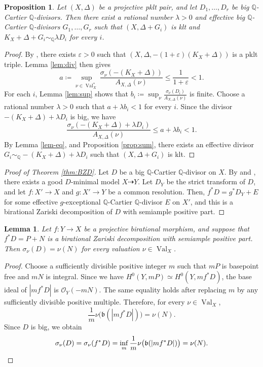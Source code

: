 \documentclass[a4paper,12pt]{amsart}
\newtheorem{lemma}[theorem]{Lemma}
\newtheorem{proposition}[theorem]{Proposition}
\theoremstyle{plain}
\theoremstyle{definition}
\numberwithin{equation}{section}
\newcommand{\Q}{\mathbb{Q}}
\newcommand{\OO}{\mathcal{O}}
\DeclareMathOperator{\Val}{Val}
\begin{document}
\begin{proposition}\label{prop:uniform-adjointization}
Let $(X,\Delta)$ be a projective pklt pair, and let $D_1,\dots,D_r$ be big $\Q$-Cartier $\Q$-divisors. Then there exist a rational number $\lambda>0$ and effective big $\Q$-Cartier $\Q$-divisors $G_1,\dots,G_r$ such that $(X,\Delta+G_i)$ is klt and $K_X+\Delta+G_i\sim_{\Q}\lambda D_i$ for every $i$.
\end{proposition}
\begin{proof}
By \cite[Proposition 4.1]{CJKL}, there exists $\varepsilon>0$ such that $(X,\Delta,-(1+\varepsilon)(K_X+\Delta))$ is a pklt triple. Lemma \ref{lem:div} then gives 
\[
a\coloneqq \sup_{\nu\in \Val_X^{\ast}} \frac{\sigma_{\nu}(-(K_X+\Delta))}{A_{X,\Delta}(\nu)}\leq \frac{1}{1+\varepsilon}<1.
\]
For each $i$, Lemma \ref{lem:sup} shows that $b_i\coloneqq \sup_{\nu} \frac{\sigma_{\nu}(D_i)}{A_{X,\Delta}(\nu)}$ is finite. Choose a rational number $\lambda>0$ such that $a+\lambda b_i<1$ for every $i$. Since the divisor $-(K_X+\Delta)+\lambda D_i$ is big, we have
\[
\frac{\sigma_{\nu}(-(K_X+\Delta)+\lambda D_i)}{A_{X,\Delta}(\nu)}\leq a+\lambda b_i<1.
\]
By Lemma \ref{lem-eq}, \cite[Theorem 3.7]{CJKL} and Proposition \ref{prop:sum}, there exists an effective divisor $G_i\sim_{\Q} -(K_X+\Delta)+\lambda D_i$ such that $(X,\Delta+G_i)$ is klt. 
\end{proof}

\begin{proof}[Proof of Theorem \ref{thm:BZD}]
    Let $D$ be a big $\Q$-Cartier $\Q$-divisor on $X$. By \cite[Theorem 3.3]{KM98} and \cite[Proof of Theorem 2.4]{KL25}, there exists a good $D$-minimal model $X\dashrightarrow Y$. Let $D_Y$ be the strict transform of $D$, and let $f\colon X'\to X$ and $g\colon X'\to Y$ be a common resolution. Then, $f^*D=g^*D_Y+E$ for some effective $g$-exceptional $\Q$-Cartier $\Q$-divisor $E$ on $X'$, and this is a birational Zariski decomposition of $D$ with semiample positive part.
\end{proof}

\begin{lemma}\label{lem-bzd}
    Let \(f\colon Y\to X\) be a projective birational morphism, and suppose that $f^{\ast}D=P+N$ is a birational Zariski decomposition with semiample positive part. Then $\sigma_{\nu}(D)=\nu(N)$ for every valuation \(\nu\in \Val_X\).
\end{lemma}
\begin{proof}
    Choose a sufficiently divisible positive integer \(m\) such that \(mP\) is basepoint free and \(mN\) is integral. Since we have $H^0(Y,mP)\simeq H^0(Y,mf^{\ast}D)$,
    the base ideal of \(|mf^{\ast}D|\) is \(\OO_Y(-mN)\). The same equality holds after replacing $m$ by any sufficiently divisible positive multiple. Therefore, for every $\nu\in\Val_X$,
    \[
    \frac{1}{m}\nu\bigl(\mathfrak b(|mf^*D|)\bigr)=\nu(N).
    \]
    Since $D$ is big, we obtain
    \[
    \sigma_\nu(D)=\sigma_\nu(f^*D)=\inf_m\frac{1}{m}\nu\bigl(\mathfrak b(|mf^*D|)\bigr)=\nu(N).\qedhere
    \]
\end{proof}
\end{document}
